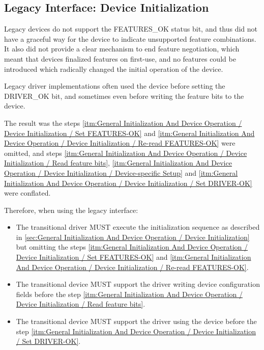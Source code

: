 \subsection{Legacy Interface: Device Initialization}\label{sec:General Initialization And Device Operation / Device Initialization / Legacy Interface: Device Initialization}
Legacy devices do not support the FEATURES_OK status bit, and thus did
not have a graceful way for the device to indicate unsupported feature
combinations.  It also did not provide a clear mechanism to end
feature negotiation, which meant that devices finalized features on
first-use, and no features could be introduced which radically changed
the initial operation of the device.

Legacy driver implementations often used the device before setting the
DRIVER_OK bit, and sometimes even before writing the feature bits
to the device.

The result was the steps \ref{itm:General Initialization And
Device Operation / Device Initialization / Set FEATURES-OK} and
\ref{itm:General Initialization And Device Operation / Device
Initialization / Re-read FEATURES-OK} were omitted, and steps
\ref{itm:General Initialization And Device Operation /
Device Initialization / Read feature bits},
\ref{itm:General Initialization And Device Operation / Device Initialization / Device-specific Setup} and \ref{itm:General Initialization And Device Operation / Device Initialization / Set DRIVER-OK}
were conflated.

Therefore, when using the legacy interface:
\begin{itemize}
\item
The transitional driver MUST execute the initialization
sequence as described in \ref{sec:General Initialization And Device
Operation / Device Initialization}
but omitting the steps \ref{itm:General Initialization And Device
Operation / Device Initialization / Set FEATURES-OK} and
\ref{itm:General Initialization And Device Operation / Device
Initialization / Re-read FEATURES-OK}.

\item
The transitional device MUST support the driver
writing device configuration fields
before the step \ref{itm:General Initialization And Device Operation /
Device Initialization / Read feature bits}.
\item
The transitional device MUST support the driver
using the device before the step \ref{itm:General Initialization
And Device Operation / Device Initialization / Set DRIVER-OK}.
\end{itemize}

